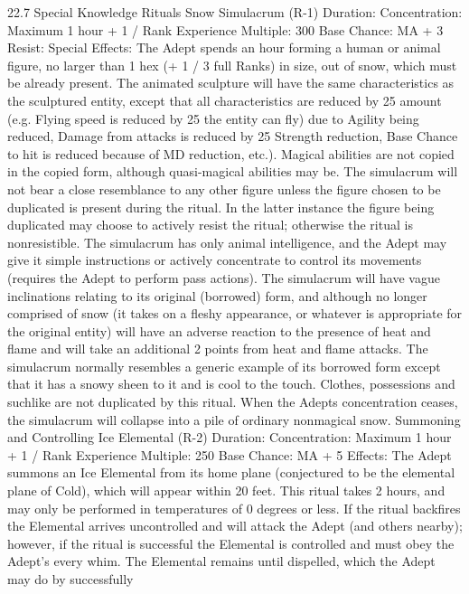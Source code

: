 \documentclass[a4paper]{article}
\begin{document}
\begin{multicols}{3}
22.7 Special Knowledge Rituals
Snow Simulacrum (R-1)
Duration: Concentration: Maximum 1 hour + 1 /
Rank
Experience Multiple: 300
Base Chance: MA + 3%
Resist: Special
Effects: The Adept spends an hour forming a human or animal figure, no larger than 1 hex (+ 1 / 3
full Ranks) in size, out of snow, which must be
already present.
The animated sculpture will have the same characteristics as the sculptured entity, except that all
characteristics are reduced by 25%
amount (e.g. Flying speed is reduced by 25%
the entity can fly) due to Agility being reduced,
Damage from attacks is reduced by 25%
Strength reduction, Base Chance to hit is reduced
because of MD reduction, etc.).
Magical abilities are not copied in the copied form,
although quasi-magical abilities may be. The simulacrum will not bear a close resemblance to any
other figure unless the figure chosen to be duplicated is present during the ritual. In the latter instance the figure being duplicated may choose to
actively resist the ritual; otherwise the ritual is nonresistible. The simulacrum has only animal intelligence, and the Adept may give it simple instructions or actively concentrate to control its movements (requires the Adept to perform pass actions).
The simulacrum will have vague inclinations relating to its original (borrowed) form, and although
no longer comprised of snow (it takes on a fleshy
appearance, or whatever is appropriate for the
original entity) will have an adverse reaction to the
presence of heat and flame and will take an additional 2 points from heat and flame attacks. The
simulacrum normally resembles a generic example
of its borrowed form except that it has a snowy
sheen to it and is cool to the touch. Clothes, possessions and suchlike are not duplicated by this
ritual.
When the Adepts concentration ceases, the simulacrum will collapse into a pile of ordinary nonmagical snow.
Summoning and Controlling Ice Elemental
(R-2)
Duration: Concentration: Maximum 1 hour + 1 /
Rank
Experience Multiple: 250
Base Chance: MA + 5%
Effects: The Adept summons an Ice Elemental
from its home plane (conjectured to be the elemental plane of Cold), which will appear within 20
feet. This ritual takes 2 hours, and may only be
performed in temperatures of 0 degrees or less. If
the ritual backfires the Elemental arrives uncontrolled and will attack the Adept (and others
nearby); however, if the ritual is successful the
Elemental is controlled and must obey the Adept’s
every whim. The Elemental remains until dispelled, which the Adept may do by successfully

\end{multicols}
\end{document}
